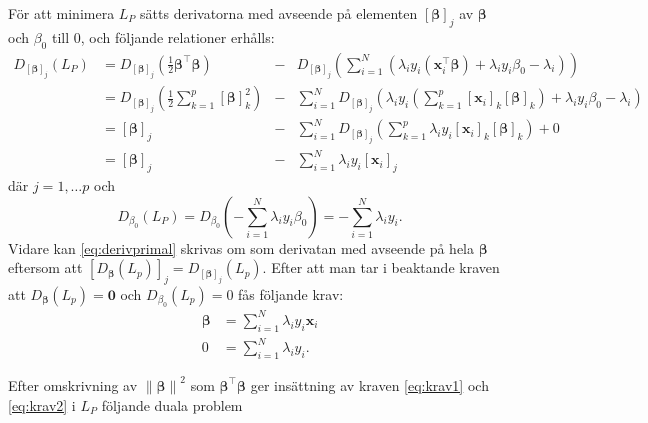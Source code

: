 \documentclass[a4paper, 12pt]{report}
\theoremstyle{definition}
\theoremstyle{remark}
\newcommand{\bfbeta}{{\boldsymbol{\beta}}}
\begin{document}
För att minimera $L_P$ sätts derivatorna med avseende på elementen $\left[\bfbeta\right]_j$ av $\bfbeta$ och $\beta_0$ till 0, och följande relationer erhålls:
\begin{equation}\label{eq:derivprimal}
\begin{aligned}
	D_{ \left[\bfbeta\right]_j } (L_P) &= D_{ \left[\bfbeta\right]_j } \left( \frac{1}{2} \bfbeta^\intercal \bfbeta \right) &- &D_{ \left[\bfbeta\right]_j } \left( \sum_{i=1}^{N} \left( \lambda_i y_i \left( \mathbf{x}_i^\intercal\bfbeta \right) + \lambda_i y_i \beta_0 - \lambda_i \right)\right)\\
	&= D_{ \left[\bfbeta\right]_j } \left( \frac{1}{2} \sum_{k=1}^{p} \left[\bfbeta\right]_k^2 \right) &- &\sum_{i=1}^{N} D_{ \left[\bfbeta\right]_j } \left(  \lambda_i y_i \left(\sum_{k=1}^{p}\left[\mathbf{x}_i\right]_k\left[\bfbeta\right]_k \right) + \lambda_i y_i \beta_0-\lambda_i \right)\\
	&= [\bfbeta]_j &- &\sum_{i=1}^{N} D_{ \left[\bfbeta\right]_j } \left( \sum_{k=1}^{p} \lambda_i y_i \left[\mathbf{x}_i\right]_k\left[\bfbeta\right]_k \right) + 0\\
	&= [\bfbeta]_j &- &\sum_{i=1}^{N}\lambda_i y_i \left[ \mathbf{x}_i \right]_j
\end{aligned}
\end{equation}
där $j=1,\dots p$ och
\begin{equation*}
	D_{\beta_0}(L_P) = D_{\beta_0}\left( -\sum_{i=1}^{N} \lambda_i y_i \beta_0 \right) = -\sum_{i=1}^{N} \lambda_i y_i.
\end{equation*}
Vidare kan \ref{eq:derivprimal} skrivas om som derivatan med avseende på hela $\bfbeta$ eftersom att $ \left[ D_{ \bfbeta }(L_p) \right]_j = D_{\left[ \bfbeta \right]_j}(L_p) $. Efter att man tar i beaktande kraven att $ D_{ \bfbeta }(L_p) = \mathbf{0} $ och $ D_{\beta_0}(L_p)=0 $ fås följande krav:
\begin{align}\label{eq:krav1}
	\bfbeta &= \sum_{i=1}^{N} \lambda_i y_i \mathbf{x}_i\\
	0 &= \sum_{i=1}^{N} \lambda_i y_i.\label{eq:krav2}
\end{align}

Efter omskrivning av $\left\| \bfbeta \right\|^2$ som $\bfbeta^\intercal\bfbeta$ ger insättning av kraven \ref{eq:krav1} och \ref{eq:krav2} i $L_P$ följande duala problem
\end{document}

